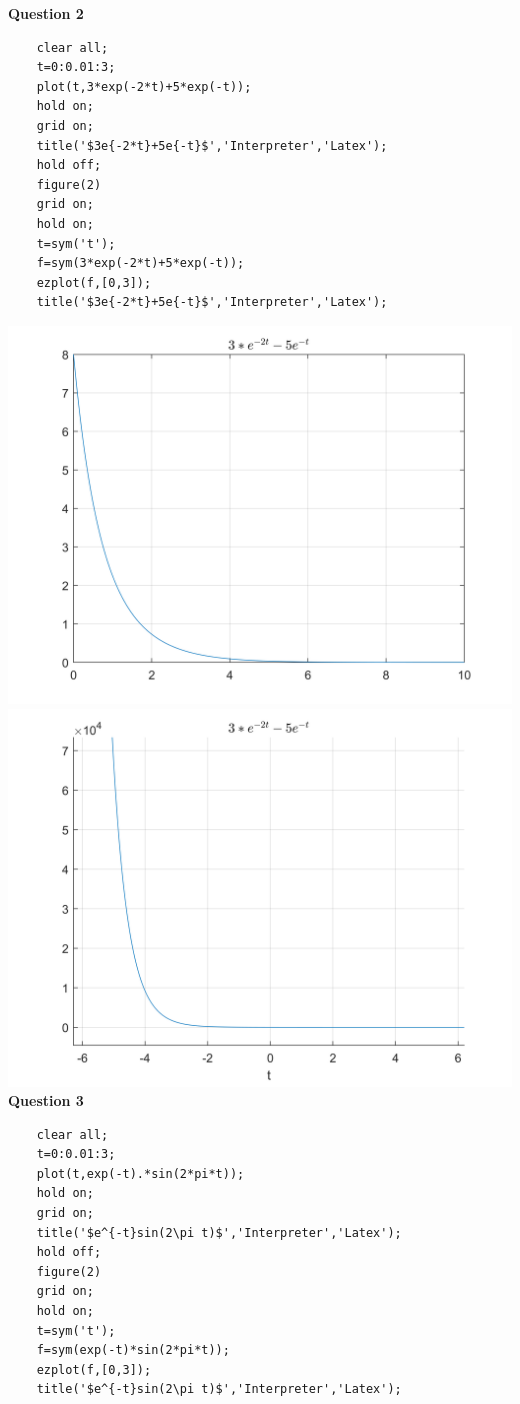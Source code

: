 \documentclass[UTF8,a4paper]{article}
\begin{document}
\textbf{Question 2}\\
\begin{lstlisting}
    clear all;
    t=0:0.01:3;
    plot(t,3*exp(-2*t)+5*exp(-t));
    hold on;
    grid on;
    title('$3e{-2*t}+5e{-t}$','Interpreter','Latex');
    hold off;
    figure(2)
    grid on;
    hold on;
    t=sym('t');
    f=sym(3*exp(-2*t)+5*exp(-t));
    ezplot(f,[0,3]);
    title('$3e{-2*t}+5e{-t}$','Interpreter','Latex');    
\end{lstlisting}
\includegraphics[scale=0.5]{8-2-1.png}
\includegraphics[scale=0.5]{8-2-2.png}\\
\textbf{Question 3}\\
\begin{lstlisting}
    clear all;
    t=0:0.01:3;
    plot(t,exp(-t).*sin(2*pi*t));
    hold on;
    grid on;
    title('$e^{-t}sin(2\pi t)$','Interpreter','Latex');
    hold off;
    figure(2)
    grid on;
    hold on;
    t=sym('t');
    f=sym(exp(-t)*sin(2*pi*t));
    ezplot(f,[0,3]);
    title('$e^{-t}sin(2\pi t)$','Interpreter','Latex'); 
\end{lstlisting}
\end{document}
